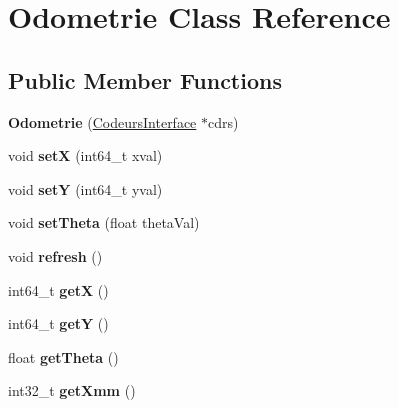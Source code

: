 \hypertarget{classOdometrie}{}\section{Odometrie Class Reference}
\label{classOdometrie}
\subsection*{Public Member Functions}
\begin{DoxyCompactItemize}
\item 
\mbox{\label{classOdometrie_aad0b9564faf2e09c531bb65100ae3c98}} 
{\bfseries Odometrie} (\hyperlink{classCodeursInterface}{Codeurs\+Interface} $\ast$cdrs)
\item 
\mbox{\label{classOdometrie_a182a36acd6ada0cc666ffed7cb63ecce}} 
void {\bfseries setX} (int64\+\_\+t xval)
\item 
\mbox{\label{classOdometrie_a3543e2a17fce781aae27247a93597c9a}} 
void {\bfseries setY} (int64\+\_\+t yval)
\item 
\mbox{\label{classOdometrie_a1d519f6e29460da12962ad32ed68b600}} 
void {\bfseries set\+Theta} (float theta\+Val)
\item 
\mbox{\label{classOdometrie_ae85189a1bf1b195430f93252d00c47d5}} 
void {\bfseries refresh} ()
\item 
\mbox{\label{classOdometrie_a4308ec860b9fd7bb0a47bcf9e6a10620}} 
int64\+\_\+t {\bfseries getX} ()
\item 
\mbox{\label{classOdometrie_a6919b090ea8dc11eb29a166d2697c659}} 
int64\+\_\+t {\bfseries getY} ()
\item 
\mbox{\label{classOdometrie_abc6576337993c68f587df8ca4b3602f9}} 
float {\bfseries get\+Theta} ()
\item 
\mbox{\label{classOdometrie_a4e35405c76f7c939f143f2d07a969e23}} 
int32\+\_\+t {\bfseries get\+Xmm} ()
\item 
\mbox{\label{classOdometrie_a349119b93cb97e0ef586fbf78e43b823}} 

\end{DoxyCompactItemize}
